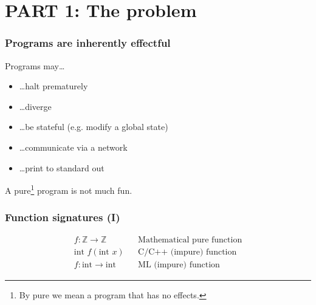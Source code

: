 
\section{PART 1: The problem}

\begin{frame}
  \frametitle{Programs are inherently effectful}
  Programs may\dots
  \begin{itemize}
    \item \dots halt prematurely
    \item \dots diverge
    \item \dots be stateful (e.g. modify a global state)
    \item \dots communicate via a network
    \item \dots print to standard out
  \end{itemize}
  A pure\footnote{By pure we mean a program that has no effects.} program is not much fun.
\end{frame}


\begin{frame}
  \frametitle{Function signatures (I)}
  \begin{align*}
    f : \mathbb{Z} \to \mathbb{Z} && \text{Mathematical pure function}\\
    \text{int } f(\text{int } x)   && \text{C/C++ (impure) function}\\
    f : \text{int} \to \text{int} && \text{ML (impure) function}
  \end{align*}
\end{frame}

